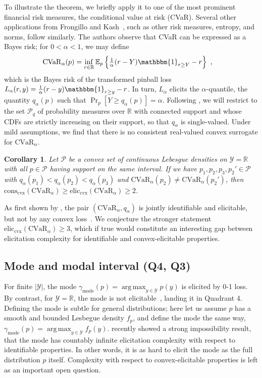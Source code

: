 \documentclass{article} %
\newcommand{\Comments}{0}
\newcommand{\mytodo}[2]{\ifnum\Comments=1%
	\todo[linecolor=#1!80!black,backgroundcolor=#1,bordercolor=#1!80!black]{#2}\fi}
\newcommand{\jessiet}[1]{\mytodo{teal!20!white}{JF: #1}}
\newcommand{\reals}{\mathbb{R}}
\newcommand{\eliccvx}{\mathrm{elic}_\mathrm{cvx}}
\newcommand{\conscvx}{\mathrm{cons}_\mathrm{cvx}}
\newcommand{\E}{\mathbb{E}}
\renewcommand{\P}{\mathcal{P}}
\newcommand{\Y}{\mathcal{Y}}
\newcommand{\CVaR}{\mathrm{CVaR}}
\newcommand{\mode}{\gamma_{\mathrm{mode}}}
\newcommand{\ones}{\mathbbm{1}}
\newtheorem{corollary}{Corollary}
\DeclareMathOperator*{\argmax}{arg\,max}
\begin{document}
To illustrate the theorem, we briefly apply it to one of the most prominent financial risk measures, the conditional value at risk (CVaR).
Several other applications from Frongillo and Kash~\citep{frongillo2020elicitation,frongillo2015elicitation}, such as other risk measures, entropy, and norms, follow similarly.
The authors observe that CVaR can be expressed as a Bayes risk; for $0 < \alpha < 1$, we may define
\begin{align}
  \CVaR_\alpha(p)
  &= \inf_{r\in\reals} \E_p\left\{ \tfrac 1 \alpha(r-Y)\ones_{r\geq Y}- r\right\}~,
  \label{eq:elic-complex-es-3}
\end{align}
which is the Bayes risk of the transformed pinball loss $L_\alpha(r,y) = \tfrac 1 \alpha(r-y)\ones_{r\geq y}-r$.
In turn, $L_\alpha$ elicits the $\alpha$-quantile, the quantity $q_\alpha(p)$ such that $\Pr_p[Y \geq q_\alpha(p)] = \alpha$.
Following \citet{frongillo2020elicitation}, we will restrict to the set $\P_q$ of probability measures over $\reals$ with connected support and whose CDFs are strictly increasing on their support, so that $q_\alpha$ is single-valued.
Under mild assumptions, we find that there is no consistent real-valued convex surrogate for $\CVaR_\alpha$.

\begin{corollary}
  \label{cor:spectral-risks}
  Let $\P$ be a convex set of continuous Lebesgue densities on $\Y=\reals$ with all $p \in \P$ having support on the same interval.
  If we have $p_1,p_2,p_3,p_2'\in\P$ with $q_\alpha(p_1) < q_\alpha(p_2) < q_\alpha(p_3)$ and $\CVaR_\alpha(p_2) \neq \CVaR_\alpha(p_2')$,
  then $\conscvx(\CVaR_\alpha) \geq \eliccvx(\CVaR_\alpha) \geq 2$.
\end{corollary}
As first shown by \citet{fissler2016higher}, the pair $(\CVaR_\alpha,q_\alpha)$ is jointly identifiable and elicitable, but not by any convex loss~\citep[Prop.\ 4.2.31]{fissler2017higher}.%
We conjecture the stronger statement $\eliccvx(\CVaR_\alpha) \geq 3$, which if true would constitute an interesting gap between elicitation complexity for identifiable and convex-elicitable properties.

\subsection{Mode and modal interval (Q4, Q3)}
\label{sec:mode-modal-interval}

For finite $|\Y|$, the mode $\mode(p) = \argmax_{y\in\Y} p(y)$ is elicited by 0-1 loss.
By contrast, for $\Y=\reals$, the mode is not elicitable~\cite{heinrich2013mode}, landing it in Quadrant 4.
Defining the mode is subtle for general distributions; here let us assume $p$ has a smooth and bounded Lesbegue density $f_p$, and define the mode the same way, $\mode(p) = \argmax_{y\in\Y} f_p(y)$.
\citet{dearborn2020indirect} recently showed a strong impossibility result, that the mode has countably infinite elicitation complexity with respect to identifiable properties.
In other words, it is as hard to elicit the mode as the full distribution $p$ itself.
Complexity with respect to convex-elicitable properties is left as an important open question.
\end{document}
